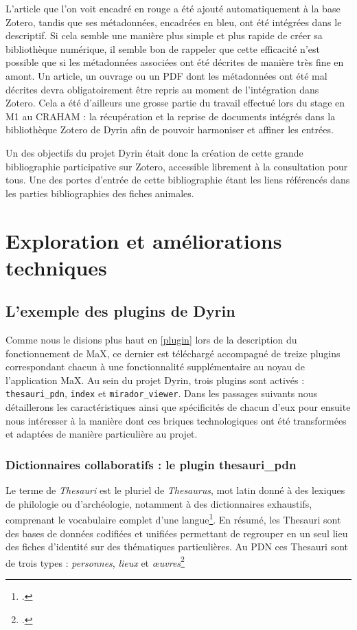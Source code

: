 \documentclass[a4paper,12pt,twoside]{book}
\begin{document}
L'article que l'on voit encadré en rouge a été ajouté automatiquement à la base Zotero, tandis que ses métadonnées, encadrées en bleu, ont été intégrées dans le descriptif.
Si cela semble une manière plus simple et plus rapide de créer sa bibliothèque numérique, il semble bon de rappeler que cette efficacité n'est possible que si les métadonnées associées ont été décrites de manière très fine en amont. Un article, un ouvrage ou un PDF dont les métadonnées ont été mal décrites devra obligatoirement être repris au moment de l'intégration dans Zotero. Cela a été d'ailleurs une grosse partie du travail effectué lors du stage en M1 au \acrshort{CRAHAM} : la récupération et la reprise de documents intégrés dans la bibliothèque Zotero de Dyrin afin de pouvoir harmoniser et affiner les entrées.


Un des objectifs du projet Dyrin était donc la création de cette grande bibliographie participative sur Zotero, accessible librement à la consultation pour tous. Une des portes d'entrée de cette bibliographie étant les liens référencés dans les parties bibliographies des fiches animales.\\



\chapter{Exploration et améliorations techniques}
\section{L'exemple des plugins de Dyrin}
Comme nous le disions plus haut en \ref{plugin} lors de la description du fonctionnement de MaX, ce dernier est téléchargé accompagné de treize plugins correspondant chacun à une fonctionnalité supplémentaire au noyau de l'application MaX. Au sein du projet Dyrin, trois plugins sont activés : \texttt{thesauri\_pdn}, \texttt{index} et \texttt{mirador\_viewer}. Dans les passages suivants nous détaillerons les caractéristiques ainsi que spécificités de chacun d'eux pour ensuite nous intéresser à la manière dont ces briques technologiques ont été transformées et adaptées de manière particulière au projet.

\subsection{Dictionnaires collaboratifs : le plugin thesauri\_pdn}\label{thesauri}
Le terme de \textit{Thesauri} est le pluriel de \textit{Thesaurus}, mot latin donné à des lexiques de philologie ou d'archéologie, notamment à des dictionnaires exhaustifs, comprenant le vocabulaire complet d'une langue\footcite{def_thesau}. En résumé, les Thesauri sont des bases de données codifiées et unifiées permettant de regrouper en un seul lieu des fiches d'identité sur des thématiques particulières. Au \acrshort{PDN} ces Thesauri sont de trois types : \textit{personnes}, \textit{lieux} et \textit{\oe{}uvres}\footcite{thesauri}
\end{document}
